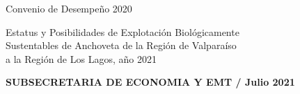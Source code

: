 \documentclass[12pt, oneside]{article} %
\begin{document}
\begin{titlepage}
\centering \fontsize{9pt}{8pt}\selectfont
            \vspace*{-3mm} 
            \hfill Convenio de Desempeño 2020 
            
\centering \fontsize{9pt}{8pt}\selectfont
            \vspace*{-16mm} 
            \hfill \begin{flushright}
            Estatus y Posibilidades de Explotación Biológicamente \\
            Sustentables de Anchoveta de la  Región de Valparaíso \\ 
            a la Región de Los Lagos, año 2021 \\
              \end{flushright} 
            \vspace*{-5mm} 
            \hfill \textbf{SUBSECRETARIA DE ECONOMIA Y EMT / Julio 2021}



\end{titlepage}
\end{document}
